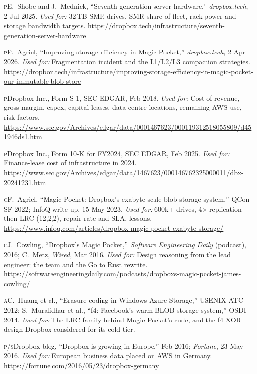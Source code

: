 \documentclass[a4paper,justified,nobib]{tufte-handout}
\begin{document}
\begin{fullwidth}
\begin{list}{}{\setlength{\leftmargin}{2.2em}\setlength{\labelwidth}{1.8em}\setlength{\labelsep}{0.4em}\setlength{\itemsep}{1.5pt}\setlength{\parsep}{0pt}}
\item[{[6]}] {\scshape\MakeLowercase{P}}\enspace E.~Shobe and J.~Mednick, ``Seventh-generation server hardware,'' \textit{dropbox.tech}, 2 Jul 2025. \textit{Used for:} 32\,TB SMR drives, SMR share of fleet, rack power and storage bandwidth targets. \url{https://dropbox.tech/infrastructure/seventh-generation-server-hardware}
\item[{[7]}] {\scshape\MakeLowercase{P}}\enspace F.~Agriel, ``Improving storage efficiency in Magic Pocket,'' \textit{dropbox.tech}, 2 Apr 2026. \textit{Used for:} Fragmentation incident and the L1/L2/L3 compaction strategies. \url{https://dropbox.tech/infrastructure/improving-storage-efficiency-in-magic-pocket-our-immutable-blob-store}
\item[{[8]}] {\scshape\MakeLowercase{P}}\enspace Dropbox Inc., Form S-1, SEC EDGAR, Feb 2018. \textit{Used for:} Cost of revenue, gross margin, capex, capital leases, data centre locations, remaining AWS use, risk factors. \url{https://www.sec.gov/Archives/edgar/data/0001467623/000119312518055809/d451946ds1.htm}
\item[{[9]}] {\scshape\MakeLowercase{P}}\enspace Dropbox Inc., Form 10-K for FY2024, SEC EDGAR, Feb 2025. \textit{Used for:} Finance-lease cost of infrastructure in 2024. \url{https://www.sec.gov/Archives/edgar/data/1467623/000146762325000011/dbx-20241231.htm}
\item[{[10]}] {\scshape\MakeLowercase{C}}\enspace F.~Agriel, ``Magic Pocket: Dropbox's exabyte-scale blob storage system,'' QCon SF 2022; InfoQ write-up, 15 May 2023. \textit{Used for:} 600k+ drives, 4$\times$ replication then LRC-(12,2,2), repair rate and SLA, lessons. \url{https://www.infoq.com/articles/dropbox-magic-pocket-exabyte-storage/}
\item[{[11]}] {\scshape\MakeLowercase{C}}\enspace J.~Cowling, ``Dropbox's Magic Pocket,'' \textit{Software Engineering Daily} (podcast), 2016; C.~Metz, \textit{Wired}, Mar 2016. \textit{Used for:} Design reasoning from the lead engineer; the team and the Go to Rust rewrite. \url{https://softwareengineeringdaily.com/podcasts/dropboxs-magic-pocket-james-cowling/}
\item[{[12]}] {\scshape\MakeLowercase{A}}\enspace C.~Huang et al., ``Erasure coding in Windows Azure Storage,'' USENIX ATC 2012; S.~Muralidhar et al., ``f4: Facebook's warm BLOB storage system,'' OSDI 2014. \textit{Used for:} The LRC family behind Magic Pocket's code, and the f4 XOR design Dropbox considered for its cold tier.
\item[{[13]}] {\scshape\MakeLowercase{P/S}}\enspace Dropbox blog, ``Dropbox is growing in Europe,'' Feb 2016; \textit{Fortune}, 23 May 2016. \textit{Used for:} European business data placed on AWS in Germany. \url{https://fortune.com/2016/05/23/dropbox-germany}

\end{list}
\end{fullwidth}
\end{document}
